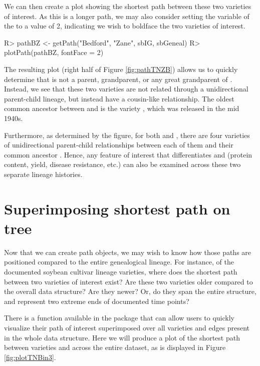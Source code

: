\documentclass[article,shortnames]{jss}
\begin{document}
We can then create a plot showing the shortest path between these two varieties of interest. As this is a longer path, we may also consider setting the  variable of the  to a value of 2, indicating we wish to boldface the two varieties of interest.

\begin{Code}
R> pathBZ <- getPath("Bedford", "Zane", sbIG, sbGeneal)
R> plotPath(pathBZ, fontFace = 2)
\end{Code}

The resulting plot (right half of Figure \ref{fig:pathTNZB}) allows us to quickly determine that  is not a parent, grandparent, or any great grandparent of . Instead, we see that these two varieties are not related through a unidirectional parent-child lineage, but instead have a cousin-like relationship. The oldest common ancestor between  and  is the variety , which was released in the mid 1940s.

Furthermore, as determined by the figure, for both  and , there are four varieties of unidirectional parent-child relationships between each of them and their common ancestor . Hence, any feature of interest that differentiates  and  (protein content, yield, disease resistance, etc.) can also be examined across these two separate lineage histories.

\section{Superimposing shortest path on tree}
\label{sspt}

Now that we can create path objects, we may wish to know how those paths are positioned compared to the entire genealogical lineage. For instance, of the documented soybean cultivar lineage varieties, where does the shortest path between two varieties of interest exist? Are these two varieties older compared to the overall data structure? Are they newer? Or, do they span the entire structure, and represent two extreme ends of documented time points?

There is a function available in the  package  that can allow users to quickly visualize their path of interest superimposed over all varieties and edges present in the whole data structure. Here we will produce a plot of the shortest path between varieties  and  across the entire dataset, as is displayed in Figure \ref{fig:plotTNBin3}.
\end{document}
